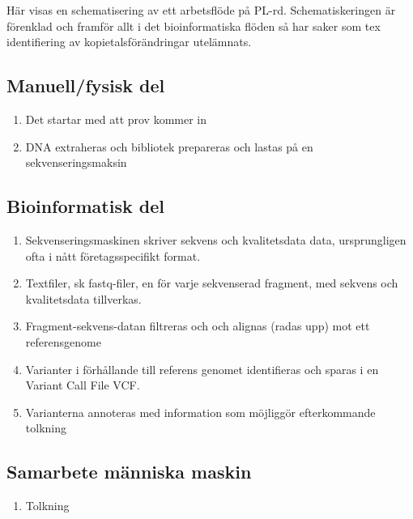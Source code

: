 \documentclass[
  letterpaper,
  DIV=11,
  numbers=noendperiod]{scrreprt}
\providecommand{\tightlist}{%
  \setlength{\itemsep}{0pt}\setlength{\parskip}{0pt}}\usepackage{longtable,booktabs,array}
\begin{document}
Här visas en schematisering av ett arbetsflöde på PL-rd.
Schematiskeringen är förenklad och framför allt i det bioinformatiska
flöden så har saker som tex identifiering av kopietalsförändringar
utelämnats.

\subsection{Manuell/fysisk del}\label{manuellfysisk-del}

\begin{enumerate}
\def\labelenumi{\arabic{enumi}.}
\item
  Det startar med att prov kommer in
\item
  DNA extraheras och bibliotek prepareras och lastas på en
  sekvenseringsmaksin
\end{enumerate}

\subsection{Bioinformatisk del}\label{bioinformatisk-del}

\begin{enumerate}
\def\labelenumi{\arabic{enumi}.}
\item
  Sekvenseringsmaskinen skriver sekvens och kvalitetsdata data,
  ursprungligen ofta i nått företagsspecifikt format.
\item
  Textfiler, sk fastq-filer, en för varje sekvenserad fragment, med
  sekvens och kvalitetsdata tillverkas.
\item
  Fragment-sekvens-datan filtreras och och alignas (radas upp) mot ett
  referensgenome
\item
  Varianter i förhållande till referens genomet identifieras och sparas
  i en Variant Call File VCF.
\item
  Varianterna annoteras med information som möjliggör efterkommande
  tolkning
\end{enumerate}

\subsection{Samarbete människa
maskin}\label{samarbete-muxe4nniska-maskin}

\begin{enumerate}
\def\labelenumi{\arabic{enumi}.}
\tightlist
\item
  Tolkning
\end{enumerate}
\end{document}
